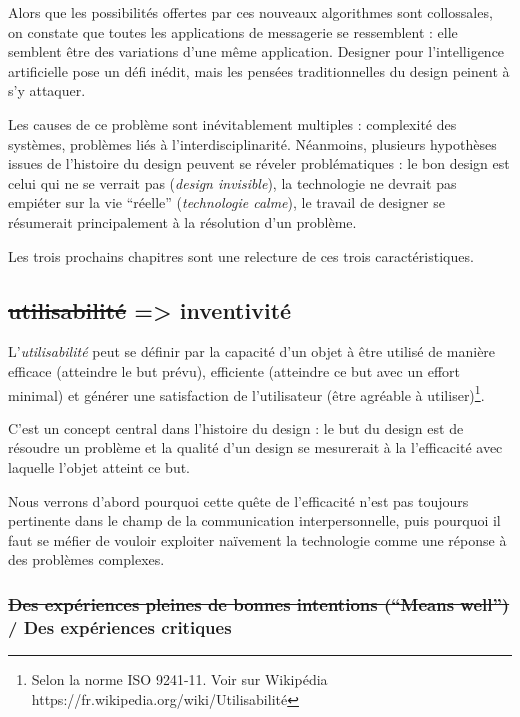 \documentclass[]{article}
\begin{document}
Alors que les possibilités offertes par ces nouveaux algorithmes sont
collossales, on constate que toutes les applications de messagerie se
ressemblent : elle semblent être des variations d'une même application.
Designer pour l'intelligence artificielle pose un défi inédit, mais les
pensées traditionnelles du design peinent à s'y attaquer.

Les causes de ce problème sont inévitablement multiples : complexité des
systèmes, problèmes liés à l'interdisciplinarité. Néanmoins, plusieurs
hypothèses issues de l'histoire du design peuvent se réveler
problématiques : le bon design est celui qui ne se verrait pas
(\emph{design invisible}), la technologie ne devrait pas empiéter sur la
vie ``réelle'' (\emph{technologie calme}), le travail de designer se
résumerait principalement à la résolution d'un problème.

Les trois prochains chapitres sont une relecture de ces trois
caractéristiques.

\newpage

\hypertarget{utilisabilituxe9-inventivituxe9}{%
\subsection{\texorpdfstring{\sout{utilisabilité} =\textgreater{}
inventivité}{utilisabilité =\textgreater{} inventivité}}\label{utilisabilituxe9-inventivituxe9}}

L'\emph{utilisabilité} peut se définir par la capacité d'un objet à être
utilisé de manière efficace (atteindre le but prévu), efficiente
(atteindre ce but avec un effort minimal) et générer une satisfaction de
l'utilisateur (être agréable à utiliser)\footnote{Selon la norme ISO
  9241-11. Voir sur Wikipédia
  https://fr.wikipedia.org/wiki/Utilisabilité}.

C'est un concept central dans l'histoire du design : le but du design
est de résoudre un problème et la qualité d'un design se mesurerait à la
l'efficacité avec laquelle l'objet atteint ce but.

Nous verrons d'abord pourquoi cette quête de l'efficacité n'est pas
toujours pertinente dans le champ de la communication interpersonnelle,
puis pourquoi il faut se méfier de vouloir exploiter naïvement la
technologie comme une réponse à des problèmes complexes.

\newpage

\hypertarget{des-expuxe9riences-pleines-de-bonnes-intentions-means-well-des-expuxe9riences-critiques}{%
\subsubsection{\texorpdfstring{\sout{Des expériences pleines de bonnes
intentions (``Means well'')} / Des expériences
critiques}{Des expériences pleines de bonnes intentions (``Means well'') / Des expériences critiques}}\label{des-expuxe9riences-pleines-de-bonnes-intentions-means-well-des-expuxe9riences-critiques}}
\end{document}
